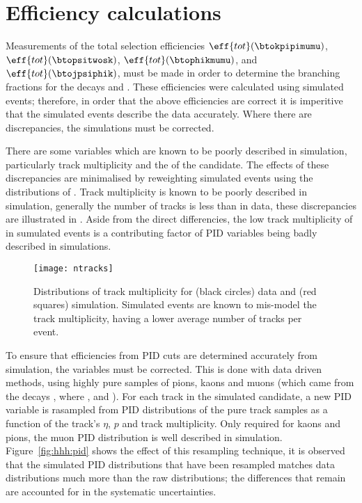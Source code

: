 \section{Efficiency calculations}
Measurements of the total selection efficiencies
$\eff{tot}(\btokpipimumu)$,
$\eff{tot}(\btopsitwosk)$,
$\eff{tot}(\btophikmumu)$, and
$\eff{tot}(\btojpsiphik)$,
must be made in order to determine the branching fractions for the decays \btokpipimumu and
\btophikmumu.
These efficiencies were calculated using simulated events; therefore, in order that the above
efficiencies are correct it is imperitive that the simulated events describe the data accurately.
Where there are discrepancies, the simulations must be corrected.

There are some variables which are known to be poorly described in simulation, particularly track
multiplicity and the \chisqvtx of the \Bp candidate.
The effects of these discrepancies are minimalised by reweighting simulated events using
the distributions of \btojpsikpipi.
Track multiplicity is known to be poorly described in simulation, generally the number of tracks is
less than in data, these discrepancies are illustrated in .
Aside from the direct differencies, the low track multiplicity of in sumulated events is a
contributing factor of PID variables being badly described in simulations.

\begin{figure}
  \begin{center}
    \texttt{[image: ntracks]}
    \caption{\small
      Distributions of track multiplicity for (black circles) data and (red squares) simulation.
      Simulated events are known to mis-model the track multiplicity, having a lower average number
      of tracks per event.
    }
    \label{fig:hhh:ntracks}
  \end{center}
\end{figure}

To ensure that efficiencies from PID cuts are determined accurately from simulation, the variables
must be corrected.
This is done with data driven methods, using highly pure samples of pions, kaons
and muons (which came from the decays \decay{\Dstarp}{\Dz\pip}, where \decay{\Dz}{\Km\pip}, and
\jpsitomumu).
For each track in the simulated \Bp candidate, a new PID variable is rasampled from PID
distributions of the pure track samples as a function of the track's $\eta$, $p$ and track
multiplicity.
Only required for kaons and pions, the muon PID distribution is well described in simulation.
Figure~\ref{fig:hhh:pid} shows the effect of this resampling technique, it is observed that the
simulated PID distributions that have been resampled matches data distributions much more than the
raw distributions; the differences that remain are accounted for in the systematic uncertainties.

